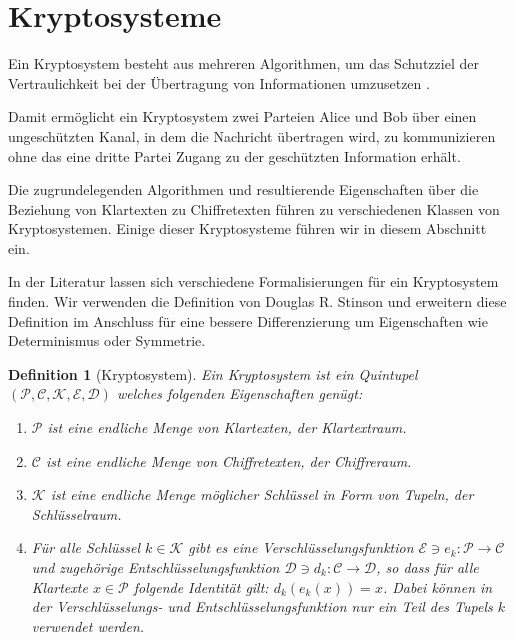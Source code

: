 \section{Kryptosysteme}
\label{kryptosystem}
Ein Kryptosystem besteht aus mehreren Algorithmen, um das Schutzziel der Vertraulichkeit bei der Übertragung von Informationen umzusetzen  \cite{Cryptosy29:online}.

Damit ermöglicht ein Kryptosystem zwei Parteien Alice und Bob über einen ungeschützten Kanal, in dem die Nachricht übertragen wird, zu kommunizieren ohne das eine dritte Partei Zugang zu der geschützten Information erhält.

Die zugrundelegenden Algorithmen und resultierende Eigenschaften über die Beziehung von Klartexten zu Chiffretexten führen zu verschiedenen Klassen von Kryptosystemen. Einige dieser Kryptosysteme führen wir in diesem Abschnitt ein. 

In der Literatur lassen sich verschiedene Formalisierungen für ein Kryptosystem finden. Wir verwenden die Definition von Douglas R. Stinson \cite[p.1]{stinson2006cryptography} und erweitern diese Definition im Anschluss für eine bessere Differenzierung um Eigenschaften wie Determinismus oder Symmetrie.

\newtheorem{theorem}{Definition}
\begin{theorem}[Kryptosystem]
	\label{KS}
	Ein Kryptosystem ist ein Quintupel $(\mathcal{P},\mathcal{C},\mathcal{K},\mathcal{E},\mathcal{D})$ welches folgenden Eigenschaften genügt:
	\begin{enumerate}
		\item $\mathcal{P}$ ist eine endliche Menge von Klartexten, der Klartextraum.
		\item $\mathcal{C}$ ist eine endliche Menge von Chiffretexten, der Chiffreraum.
		\item $\mathcal{K}$ ist eine endliche Menge möglicher Schlüssel in Form von Tupeln, der Schlüsselraum.
		\item Für alle Schlüssel $k\in \mathcal{K}$ gibt es eine Verschlüsselungsfunktion $\mathcal{E}\ni e_k:\mathcal{P}\rightarrow\mathcal{C}$ und zugehörige Entschlüsselungsfunktion $\mathcal{D}\ni d_k:\mathcal{C}\rightarrow\mathcal{D}$, so dass für alle Klartexte $x\in\mathcal{P}$ folgende Identität gilt: $d_k(e_k(x)) = x$. Dabei können in der Verschlüsselungs- und Entschlüsselungsfunktion nur ein Teil des Tupels $k$ verwendet werden.
	\end{enumerate}
\end{theorem}

